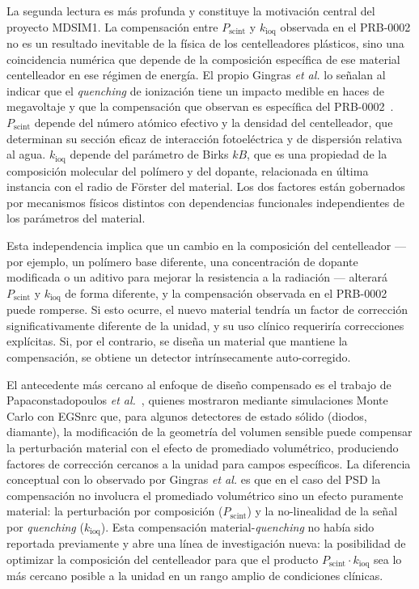 \documentclass[11pt,a4paper]{article}
\begin{document}
La segunda lectura es más profunda y constituye la motivación central del proyecto MDSIM1. La compensación entre $P_{\mathrm{scint}}$ y $k_{\mathrm{ioq}}$ observada en el PRB-0002 no es un resultado inevitable de la física de los centelleadores plásticos, sino una coincidencia numérica que depende de la composición específica de ese material centelleador en ese régimen de energía. El propio Gingras \textit{et al.} lo señalan al indicar que el \textit{quenching} de ionización tiene un impacto medible en haces de megavoltaje y que la compensación que observan es específica del PRB-0002~\cite{gingras2025}. $P_{\mathrm{scint}}$ depende del número atómico efectivo y la densidad del centelleador, que determinan su sección eficaz de interacción fotoeléctrica y de dispersión relativa al agua. $k_{\mathrm{ioq}}$ depende del parámetro de Birks $kB$, que es una propiedad de la composición molecular del polímero y del dopante, relacionada en última instancia con el radio de Förster del material. Los dos factores están gobernados por mecanismos físicos distintos con dependencias funcionales independientes de los parámetros del material.

Esta independencia implica que un cambio en la composición del centelleador --- por ejemplo, un polímero base diferente, una concentración de dopante modificada o un aditivo para mejorar la resistencia a la radiación --- alterará $P_{\mathrm{scint}}$ y $k_{\mathrm{ioq}}$ de forma diferente, y la compensación observada en el PRB-0002 puede romperse. Si esto ocurre, el nuevo material tendría un factor de corrección significativamente diferente de la unidad, y su uso clínico requeriría correcciones explícitas. Si, por el contrario, se diseña un material que mantiene la compensación, se obtiene un detector intrínsecamente auto-corregido.

El antecedente más cercano al enfoque de diseño compensado es el trabajo de Papaconstadopoulos \textit{et al.}~\cite{papaconstadopoulos2014}, quienes mostraron mediante simulaciones Monte Carlo con EGSnrc que, para algunos detectores de estado sólido (diodos, diamante), la modificación de la geometría del volumen sensible puede compensar la perturbación material con el efecto de promediado volumétrico, produciendo factores de corrección cercanos a la unidad para campos específicos. La diferencia conceptual con lo observado por Gingras \textit{et al.} es que en el caso del PSD la compensación no involucra el promediado volumétrico sino un efecto puramente material: la perturbación por composición ($P_{\mathrm{scint}}$) y la no-linealidad de la señal por \textit{quenching} ($k_{\mathrm{ioq}}$). Esta compensación material-\textit{quenching} no había sido reportada previamente y abre una línea de investigación nueva: la posibilidad de optimizar la composición del centelleador para que el producto $P_{\mathrm{scint}} \cdot k_{\mathrm{ioq}}$ sea lo más cercano posible a la unidad en un rango amplio de condiciones clínicas.
\end{document}
